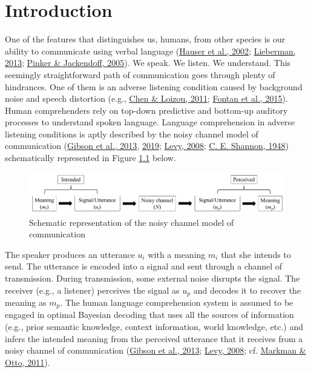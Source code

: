 \documentclass[a4paper, nobind]{templates/ociamthesis}
\begin{document}
\flushbottom

\hypertarget{chapter-introduction}{%
\chapter{Introduction}\label{chapter-introduction}}

One of the features that distinguishes us, humans, from other species is our ability to communicate using verbal language (\protect\hyperlink{ref-Hauser2002}{Hauser et al., 2002}; \protect\hyperlink{ref-Lieberman2013}{Lieberman, 2013}; \protect\hyperlink{ref-Pinker2005a}{Pinker \& Jackendoff, 2005}).
We speak. We listen. We understand.
This seemingly straightforward path of communication goes through plenty of hindrances.
One of them is an adverse listening condition caused by background noise and speech distortion (e.g., \protect\hyperlink{ref-Chen2011}{Chen \& Loizou, 2011}; \protect\hyperlink{ref-Fontan2015}{Fontan et al., 2015}).
Human comprehenders rely on top-down predictive and bottom-up auditory processes to understand spoken language.
Language comprehension in adverse listening conditions is aptly described by the noisy channel model of communication (\protect\hyperlink{ref-Gibson2013}{Gibson et al., 2013}, \protect\hyperlink{ref-Gibson2019}{2019}; \protect\hyperlink{ref-Levy2008}{Levy, 2008}; \protect\hyperlink{ref-Shannon1948}{C. E. Shannon, 1948})
schematically represented in Figure \ref{fig:noisy-channel} below.

\begin{figure}[!htpb]

{\centering \includegraphics[width=0.9\linewidth]{figures/materials/noisy-channel} 

}

\caption{Schematic representation of the noisy channel model of communication}\label{fig:noisy-channel}
\end{figure}

The speaker produces an utterance \(u_i\) with a meaning \(m_i\) that she intends to send.
The utterance is encoded into a signal and sent through a channel of transmission.
During transmission, some external noise disrupts the signal.
The receiver (e.g., a listener) perceives the signal as \(u_p\) and decodes it to recover the meaning as \(m_p\).
The human language comprehension system is assumed to be engaged in optimal Bayesian decoding that uses all the sources of information
(e.g., prior semantic knowledge, context information, world knowledge, etc.)
and infers the intended meaning from the perceived utterance that it receives from a noisy channel of communication (\protect\hyperlink{ref-Gibson2013}{Gibson et al., 2013}; \protect\hyperlink{ref-Levy2008}{Levy, 2008}; cf. \protect\hyperlink{ref-Markman2011}{Markman \& Otto, 2011}).
\end{document}
